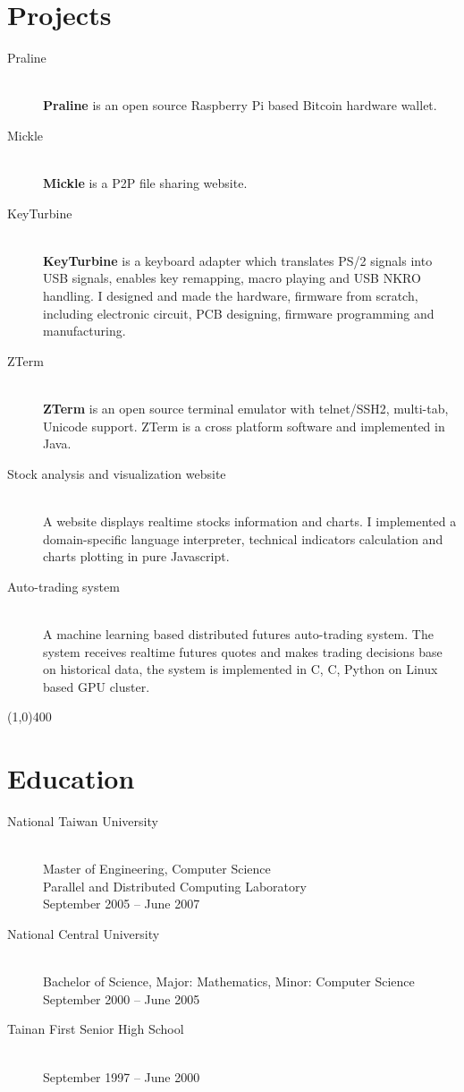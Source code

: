 \documentclass[10pt,a4paper]{article}
\newcommand{\hr}{\noindent\line(1,0){400}}
\newcommand{\br}{\hfill\\}
\newcommand{\CS}{C\nolinebreak\hspace{-.05em}\raisebox{.6ex}{\scriptsize\textbf\#}}
\begin{document}
\section*{Projects}
\begin{description}
\item[Praline]\br
\textbf{Praline} is an open source Raspberry Pi based Bitcoin hardware wallet.

\item[Mickle]\br
\textbf{Mickle} is a P2P file sharing website.

\item[KeyTurbine]\br
\textbf{KeyTurbine} is a keyboard adapter which translates PS/2 signals into USB signals, enables key remapping, macro playing and USB NKRO handling.
I designed and made the hardware, firmware from scratch, including electronic circuit, PCB designing, firmware programming and manufacturing.

\item[ZTerm]\br
\textbf{ZTerm} is an open source terminal emulator with telnet/SSH2, multi-tab, Unicode support.
ZTerm is a cross platform software and implemented in Java.\br

\item[Stock analysis and visualization website]\br
A website displays realtime stocks information and charts.
I implemented a domain-specific language interpreter, technical indicators calculation and charts plotting in pure Javascript.\br

\item[Auto-trading system]\br
A machine learning based distributed futures auto-trading system.
The system receives realtime futures quotes and makes trading decisions base on historical data, the system is implemented in C, \CS, Python on Linux based GPU cluster.
\end{description}

\hr
\section*{Education}
\begin{description}
\item[National Taiwan University]\br
Master of Engineering, Computer Science\br
Parallel and Distributed Computing Laboratory\br
September 2005 -- June 2007

\item[National Central University]\br
Bachelor of Science, Major: Mathematics, Minor: Computer Science\br
September 2000 -- June 2005

\item[Tainan First Senior High School]\br
September 1997 -- June 2000
\end{description}
\end{document}
